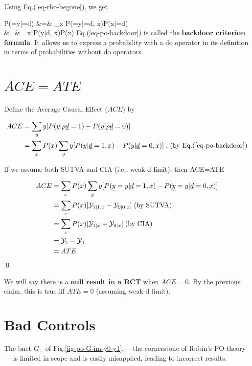 Using Eq.(\ref{eq-rho-begone}), we get

\beqa
P(\rvy=y|\rho\rvd=d)
&=&
\sum_x 
P(\rvy=y|\rho\rvd=d, x)P(x|\rho\rvd=d)
\\
&=&
\sum_x 
P(y|d, x)P(x)
\label{eq-po-backdoor}
\eeqa
Eq.(\ref{eq-po-backdoor})
is called the {\bf backdoor criterion formula}.
It allows us to
express a
probability
with a do operator
in its definition
in terms 
of  probabilities
without do operators.

\section{$ACE=ATE$}



Define the Average
Causal Effect ($ACE$) by

\begin{align}
ACE&=\sum_y y
[P(y|\rho{\underline{d}}=1)-P(y|\rho{\underline{d}}=0)]
\\
&=
\sum_x P(x)\sum_y y [P(y|{\underline{d}}=1,x)-P(y|{\underline{d}}=0,x)]
\;. \text{ (by Eq.(\ref{eq-po-backdoor})}
\label{eq-my-backdoor-proof} 
\end{align}


\begin{claim}\label{cl-ace-ate}
If we assume both SUTVA and 
CIA (i.e., weak-d limit), then
\beq
ACE=ATE
\eeq
\end{claim}
\proof



\begin{align}
ACE&=
\sum_x P(x)\sum_y y [P({\underline{y}}=y|{\underline{d}}=1,x)-
P({\underline{y}}=y|{\underline{d}}=0,x)] 
\\
&=\sum_x P(x)[{\cal Y}_{1|1, x}-{\cal Y}_{0|0, x}]
\;\text{(by SUTVA)}
\\
&=\sum_x P(x)[{\cal Y}_{1|x}-{\cal Y}_{0|x}]
\;\text{(by CIA)}
\\
&=
{\cal Y}_{1}-{\cal Y}_{0}
\\
&=
ATE
\end{align}
\qed

We will say there is a {\bf null result
in a RCT} when $ACE=0$. By the previous claim, 
this is true iff $ATE=0$
(assuming weak-d limit).

\section{Bad Controls}

The bnet $G_+$
of Fig.\ref{fig-po-G-im-y0-y1}, 
---the cornerstone of Rubin's 
PO theory--- is limited in scope
and is easily
misapplied, leading
to incorrect results.


